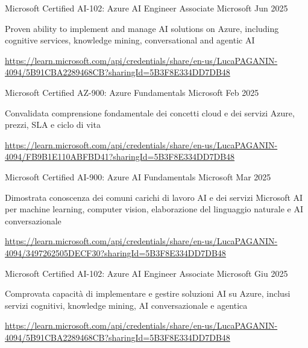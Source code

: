 \begin{cventries}
\cventry
{Microsoft Certified} %
{AI-102: Azure AI Engineer Associate} %
{Microsoft} %
{Jun 2025} %
{ %
\begin{cvitems}
  \item {Proven ability to implement and manage AI solutions on Azure, including cognitive services, knowledge mining, conversational and agentic AI}
  \item {\url{https://learn.microsoft.com/api/credentials/share/en-us/LucaPAGANIN-4094/5B91CBA2289468CB?sharingId=5B3F8E334DD7DB48}}
\end{cvitems}
}
\else
\cventry
{Microsoft Certified} %
{AZ-900: Azure Fundamentals} %
{Microsoft} %
{Feb 2025} %
{ %
\begin{cvitems}
  \item {Convalidata comprensione fondamentale dei concetti cloud e dei servizi Azure, prezzi, SLA e ciclo di vita}
  \item {\url{https://learn.microsoft.com/api/credentials/share/en-us/LucaPAGANIN-4094/FB9B1E110ABFBD41?sharingId=5B3F8E334DD7DB48}}
\end{cvitems}
}

\cventry
{Microsoft Certified} %
{AI-900: Azure AI Fundamentals} %
{Microsoft} %
{Mar 2025} %
{ %
\begin{cvitems}
  \item {Dimostrata conoscenza dei comuni carichi di lavoro AI e dei servizi Microsoft AI per machine learning, computer vision, elaborazione del linguaggio naturale e AI conversazionale}
  \item {\url{https://learn.microsoft.com/api/credentials/share/en-us/LucaPAGANIN-4094/3497262505DECF30?sharingId=5B3F8E334DD7DB48}}
\end{cvitems}
}

\cventry
{Microsoft Certified} %
{AI-102: Azure AI Engineer Associate} %
{Microsoft} %
{Giu 2025} %
{ %
\begin{cvitems}
  \item {Comprovata capacità di implementare e gestire soluzioni AI su Azure, inclusi servizi cognitivi, knowledge mining, AI conversazionale e agentica}
  \item {\url{https://learn.microsoft.com/api/credentials/share/en-us/LucaPAGANIN-4094/5B91CBA2289468CB?sharingId=5B3F8E334DD7DB48}}
\end{cvitems}
}
\fi

\end{cventries}
